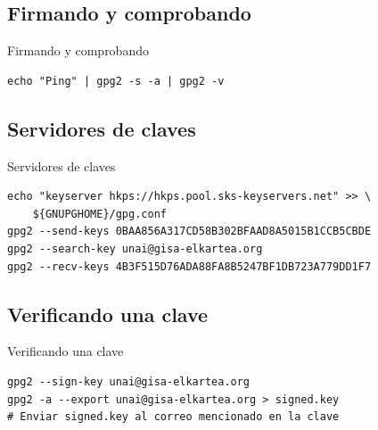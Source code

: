 \documentclass{beamer}
\begin{document}
\subsection{Firmando y comprobando}
\begin{frame}[fragile]{Firmando y comprobando}
\begin{lstlisting}
echo "Ping" | gpg2 -s -a | gpg2 -v
\end{lstlisting}
\end{frame}


\subsection{Servidores de claves}
\begin{frame}[fragile]{Servidores de claves}
\begin{lstlisting}
echo "keyserver hkps://hkps.pool.sks-keyservers.net" >> \
    ${GNUPGHOME}/gpg.conf
gpg2 --send-keys 0BAA856A317CD58B302BFAAD8A5015B1CCB5CBDE
gpg2 --search-key unai@gisa-elkartea.org
gpg2 --recv-keys 4B3F515D76ADA88FA8B5247BF1DB723A779DD1F7
\end{lstlisting}
\end{frame}


\subsection{Verificando una clave}
\begin{frame}[fragile]{Verificando una clave}
\begin{lstlisting}
gpg2 --sign-key unai@gisa-elkartea.org
gpg2 -a --export unai@gisa-elkartea.org > signed.key
# Enviar signed.key al correo mencionado en la clave
\end{lstlisting}
\end{frame}
\end{document}
